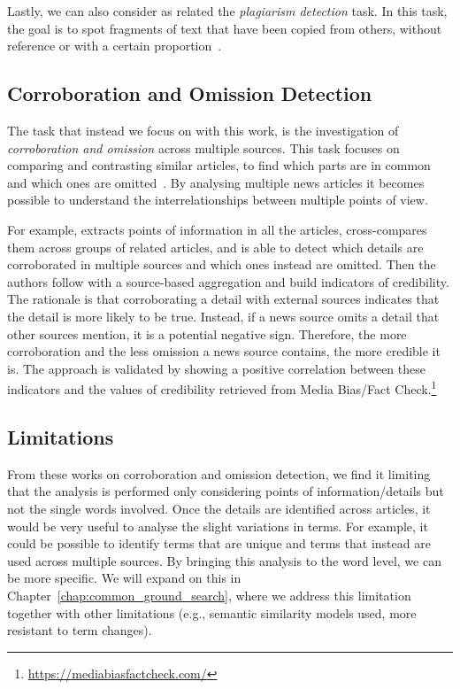 Lastly, we can also consider as related the \emph{plagiarism detection} task.
In this task, the goal is to spot fragments of text that have been copied from others, without reference or with a certain proportion~\citep{stein2006near,alzahrani2010fuzzy,arabi2022improving}.


\subsection{\statusgreen Corroboration and Omission Detection}
\label{ssec:lit_relationships_corr_omiss}

The task that instead we focus on with this work, is the investigation of \textit{corroboration and omission} across multiple sources.
This task focuses on comparing and contrasting similar articles, to find which parts are in common and which ones are omitted~\cite{ehrhardt2021omission,bountouridis2018explaining,ko2023claimdiff}.
By analysing multiple news articles it becomes possible to understand the interrelationships between multiple points of view.

For example, \cite{bountouridis2018explaining} extracts points of information in all the articles, cross-compares them across groups of related articles, and is able to detect which details are corroborated in multiple sources and which ones instead are omitted.
Then the authors follow with a source-based aggregation and build indicators of credibility. The rationale is that corroborating a detail with external sources indicates that the detail is more likely to be true.
Instead, if a news source omits a detail that other sources mention, it is a potential negative sign.
Therefore, the more corroboration and the less omission a news source contains, the more credible it is.
The approach is validated by showing a positive correlation between these indicators and the values of credibility retrieved from Media Bias/Fact Check.\footnote{\url{https://mediabiasfactcheck.com/}}

\subsection{\statusgreen Limitations}

From these works on corroboration and omission detection, we find it limiting that the analysis is performed only considering points of information/details but not the single words involved.
Once the details are identified across articles, it would be very useful to analyse the slight variations in terms.
For example, it could be possible to identify terms that are unique and terms that instead are used across multiple sources. By bringing this analysis to the word level, we can be more specific.
We will expand on this in Chapter~\ref{chap:common_ground_search}, where we address this limitation together with other limitations (e.g., semantic similarity models used, more resistant to term changes).

